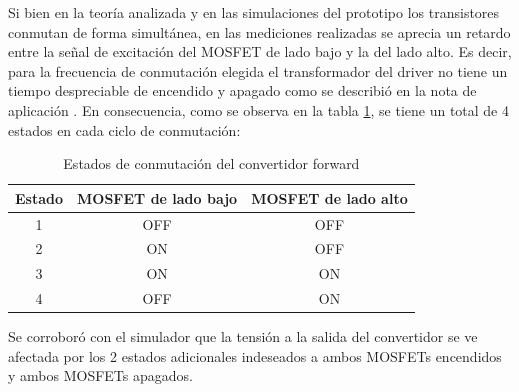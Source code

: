 Si bien en la teoría analizada y en las simulaciones del prototipo los transistores conmutan de forma simultánea, en las mediciones realizadas se aprecia un retardo entre la señal de excitación del MOSFET de lado bajo y la del lado alto. 
Es decir, para la frecuencia de conmutación elegida el transformador del driver no tiene un tiempo despreciable de encendido y apagado como se describió en la nota de aplicación \cite{gatedrivers}.  
En consecuencia, como se observa en la tabla \ref{tab:estados}, se tiene un total de 4 estados en cada ciclo de conmutación:

\begin{table}[H]
    \centering
    \begin{tabular}{ccc}
    \hline
    Estado & MOSFET de lado bajo & MOSFET de lado alto \\ \hline
    1      & OFF                 & OFF                 \\
    2      & ON                  & OFF                 \\
    3      & ON                  & ON                  \\
    4      & OFF                 & ON                  \\ \hline
    \end{tabular}
    \caption{Estados de conmutación del convertidor forward}
    \label{tab:estados}
\end{table}

Se corroboró con el simulador que la tensión a la salida del convertidor se ve afectada por los 2 estados adicionales indeseados a ambos MOSFETs encendidos y ambos MOSFETs apagados.

